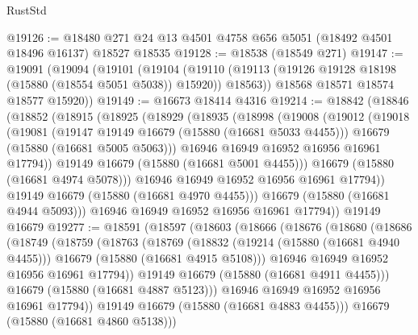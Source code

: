 \begin{lexlean}{RustStd}
\begin{coremodule}
@19126 := @18480 @271 @24 @13 @4501 @4758 @656 @5051 (@18492 @4501 @18496 @16137) @18527 @18535
@19128 := @18538 (@18549 @271)
@19147 := @19091
    (@19094
      (@19101
        (@19104
          (@19110 (@19113 (@19126 @19128 @18198 (@15880 (@18554 @5051 @5038)) @15920)) @18563))
        @18568
        @18571
        @18574
        @18577
        @15920))
@19149 := @16673 @18414 @4316
@19214 := @18842
    (@18846
      (@18852
        (@18915
          (@18925
            (@18929
              (@18935
                (@18998
                  (@19008
                    (@19012
                      (@19018
                        (@19081
                          (@19147 @19149 @16679 (@15880 (@16681 @5033 @4455)))
                          @16679
                          (@15880 (@16681 @5005 @5063)))
                        @16946
                        @16949
                        @16952
                        @16956
                        @16961
                        @17794))
                    @19149
                    @16679
                    (@15880 (@16681 @5001 @4455)))
                  @16679
                  (@15880 (@16681 @4974 @5078)))
                @16946
                @16949
                @16952
                @16956
                @16961
                @17794))
            @19149
            @16679
            (@15880 (@16681 @4970 @4455)))
          @16679
          (@15880 (@16681 @4944 @5093)))
        @16946
        @16949
        @16952
        @16956
        @16961
        @17794))
    @19149
    @16679
@19277 := @18591
    (@18597
      (@18603
        (@18666
          (@18676
            (@18680
              (@18686
                (@18749
                  (@18759
                    (@18763
                      (@18769
                        (@18832
                          (@19214 (@15880 (@16681 @4940 @4455)))
                          @16679
                          (@15880 (@16681 @4915 @5108)))
                        @16946
                        @16949
                        @16952
                        @16956
                        @16961
                        @17794))
                    @19149
                    @16679
                    (@15880 (@16681 @4911 @4455)))
                  @16679
                  (@15880 (@16681 @4887 @5123)))
                @16946
                @16949
                @16952
                @16956
                @16961
                @17794))
            @19149
            @16679
            (@15880 (@16681 @4883 @4455)))
          @16679
          (@15880 (@16681 @4860 @5138)))

\end{coremodule}
\end{lexlean}
